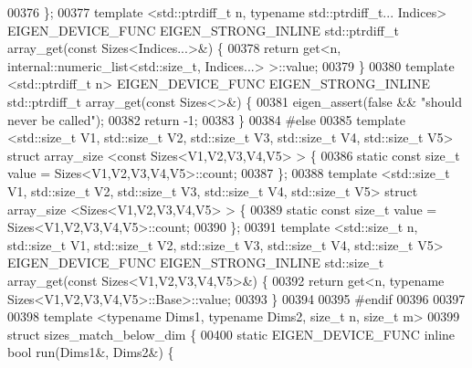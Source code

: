 \begin{DoxyCode}
00376 \};
00377 \textcolor{keyword}{template} <std::ptrdiff\_t n, \textcolor{keyword}{typename} std::ptrdiff\_t... Indices> EIGEN\_DEVICE\_FUNC EIGEN\_STRONG\_INLINE 
      std::ptrdiff\_t array\_get(\textcolor{keyword}{const} Sizes<Indices...>&) \{
00378   \textcolor{keywordflow}{return} \textcolor{keyword}{get}<n, internal::numeric\_list<std::size\_t, Indices...> >::value;
00379 \}
00380 \textcolor{keyword}{template} <std::ptrdiff\_t n> EIGEN\_DEVICE\_FUNC EIGEN\_STRONG\_INLINE std::ptrdiff\_t array\_get(\textcolor{keyword}{const} Sizes<>&) 
      \{
00381   eigen\_assert(\textcolor{keyword}{false} && \textcolor{stringliteral}{"should never be called"});
00382   \textcolor{keywordflow}{return} -1;
00383 \}
00384 \textcolor{preprocessor}{#else}
00385 \textcolor{keyword}{template} <std::\textcolor{keywordtype}{size\_t} V1, std::\textcolor{keywordtype}{size\_t} V2, std::\textcolor{keywordtype}{size\_t} V3, std::\textcolor{keywordtype}{size\_t} V4, std::\textcolor{keywordtype}{size\_t} V5> \textcolor{keyword}{struct }array\_size
      <const Sizes<V1,V2,V3,V4,V5> > \{
00386   \textcolor{keyword}{static} \textcolor{keyword}{const} \textcolor{keywordtype}{size\_t} value = Sizes<V1,V2,V3,V4,V5>::count;
00387 \};
00388 \textcolor{keyword}{template} <std::\textcolor{keywordtype}{size\_t} V1, std::\textcolor{keywordtype}{size\_t} V2, std::\textcolor{keywordtype}{size\_t} V3, std::\textcolor{keywordtype}{size\_t} V4, std::\textcolor{keywordtype}{size\_t} V5> \textcolor{keyword}{struct }array\_size
      <Sizes<V1,V2,V3,V4,V5> > \{
00389   \textcolor{keyword}{static} \textcolor{keyword}{const} \textcolor{keywordtype}{size\_t} value = Sizes<V1,V2,V3,V4,V5>::count;
00390 \};
00391 \textcolor{keyword}{template} <std::\textcolor{keywordtype}{size\_t} n, std::\textcolor{keywordtype}{size\_t} V1, std::\textcolor{keywordtype}{size\_t} V2, std::\textcolor{keywordtype}{size\_t} V3, std::\textcolor{keywordtype}{size\_t} V4, std::\textcolor{keywordtype}{size\_t} V5> 
      EIGEN\_DEVICE\_FUNC EIGEN\_STRONG\_INLINE std::size\_t array\_get(\textcolor{keyword}{const} Sizes<V1,V2,V3,V4,V5>&) \{
00392   \textcolor{keywordflow}{return} get<n, typename Sizes<V1,V2,V3,V4,V5>::Base>::value;
00393 \}
00394 
00395 \textcolor{preprocessor}{#endif}
00396 
00397 
00398 \textcolor{keyword}{template} <\textcolor{keyword}{typename} Dims1, \textcolor{keyword}{typename} Dims2, \textcolor{keywordtype}{size\_t} n, \textcolor{keywordtype}{size\_t} m>
00399 \textcolor{keyword}{struct }sizes\_match\_below\_dim \{
00400   \textcolor{keyword}{static} EIGEN\_DEVICE\_FUNC  \textcolor{keyword}{inline} \textcolor{keywordtype}{bool} run(Dims1&, Dims2&) \{

\end{DoxyCode}

